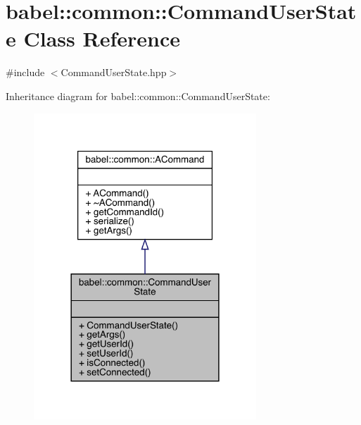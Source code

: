 \hypertarget{classbabel_1_1common_1_1_command_user_state}{}\section{babel\+:\+:common\+:\+:Command\+User\+State Class Reference}
\label{classbabel_1_1common_1_1_command_user_state}


{\ttfamily \#include $<$Command\+User\+State.\+hpp$>$}



Inheritance diagram for babel\+:\+:common\+:\+:Command\+User\+State\+:\nopagebreak
\begin{figure}[H]
\begin{center}
\leavevmode
\includegraphics[width=237pt]{classbabel_1_1common_1_1_command_user_state__inherit__graph}
\end{center}
\end{figure}


